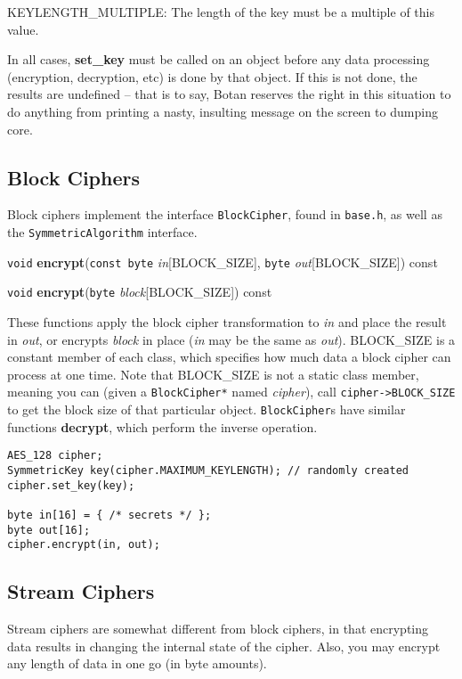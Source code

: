 \documentclass{article}
\newcommand{\filename}[1]{\texttt{#1}}
\newcommand{\function}[1]{\textbf{#1}}
\newcommand{\type}[1]{\texttt{#1}}
\renewcommand{\arg}[1]{\textsl{#1}}
\begin{document}
KEYLENGTH\_MULTIPLE: The length of the key must be a multiple of this value.

In all cases, \function{set\_key} must be called on an object before any data
processing (encryption, decryption, etc) is done by that object. If this is not
done, the results are undefined -- that is to say, Botan reserves the right in
this situation to do anything from printing a nasty, insulting message on the
screen to dumping core.

\subsection{Block Ciphers}

Block ciphers implement the interface \type{BlockCipher}, found in
\filename{base.h}, as well as the \type{SymmetricAlgorithm} interface.

\noindent
\type{void} \function{encrypt}(\type{const byte} \arg{in}[BLOCK\_SIZE],
                               \type{byte} \arg{out}[BLOCK\_SIZE]) const

\noindent
\type{void} \function{encrypt}(\type{byte} \arg{block}[BLOCK\_SIZE]) const

These functions apply the block cipher transformation to \arg{in} and
place the result in \arg{out}, or encrypts \arg{block} in place
(\arg{in} may be the same as \arg{out}). BLOCK\_SIZE is a constant
member of each class, which specifies how much data a block cipher can
process at one time. Note that BLOCK\_SIZE is not a static class
member, meaning you can (given a \type{BlockCipher*} named
\arg{cipher}), call \verb|cipher->BLOCK_SIZE| to get the block size of
that particular object. \type{BlockCipher}s have similar functions
\function{decrypt}, which perform the inverse operation.

\begin{verbatim}
AES_128 cipher;
SymmetricKey key(cipher.MAXIMUM_KEYLENGTH); // randomly created
cipher.set_key(key);

byte in[16] = { /* secrets */ };
byte out[16];
cipher.encrypt(in, out);
\end{verbatim}

\subsection{Stream Ciphers}

Stream ciphers are somewhat different from block ciphers, in that encrypting
data results in changing the internal state of the cipher. Also, you may
encrypt any length of data in one go (in byte amounts).
\end{document}
